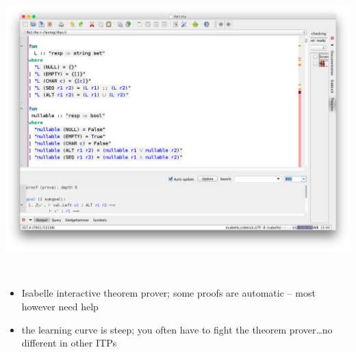 \documentclass[dvipsnames,14pt,t]{beamer}
\begin{document}
  \begin{frame}[c]

  \begin{center}
  \includegraphics[scale=0.2]{pics/isabelle.png}
  \end{center}
  \mbox{}\\[-20mm]\mbox{}

  \begin{itemize}
  \item Isabelle interactive theorem prover; 
  some proofs are automatic -- most however need help
  \item the learning curve is steep; you often have to fight the 
  theorem prover\ldots no different in other ITPs
  \end{itemize}

  \end{frame}
\end{document}
